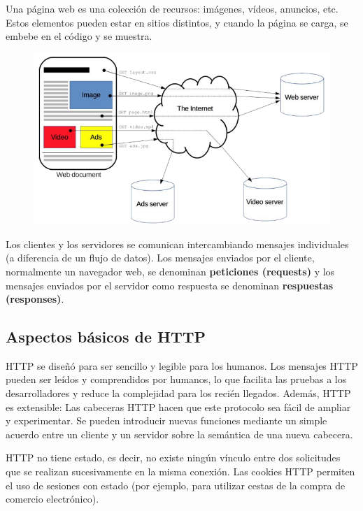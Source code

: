 Una página web es una colección de recursos: imágenes, vídeos, anuncios, etc. Estos elementos pueden estar en sitios distintos, y cuando la página se carga, se embebe en el código y se muestra.
\begin{figure}[htbp]
\centering
\includegraphics[width = \textwidth]{figs/web-http.png}
\end{figure}

Los clientes y los servidores se comunican intercambiando mensajes individuales (a diferencia de un flujo de datos). Los mensajes enviados por el cliente, normalmente un navegador web, se denominan \textbf{peticiones (requests)} y los mensajes enviados por el servidor como respuesta se denominan \textbf{respuestas (responses)}.

\subsection{Aspectos básicos de HTTP}
HTTP se diseñó para ser sencillo y legible para los humanos. Los mensajes HTTP pueden ser leídos y comprendidos por humanos, lo que facilita las pruebas a los desarrolladores y reduce la complejidad para los recién llegados. Además, HTTP es extensible: Las cabeceras HTTP hacen que este protocolo sea fácil de ampliar y experimentar. Se pueden introducir nuevas funciones mediante un simple acuerdo entre un cliente y un servidor sobre la semántica de una nueva cabecera.

HTTP no tiene estado, es decir, no existe ningún vínculo entre dos solicitudes que se realizan sucesivamente en la misma conexión. Las cookies HTTP permiten el uso de sesiones con estado (por ejemplo, para utilizar cestas de la compra de comercio electrónico).

